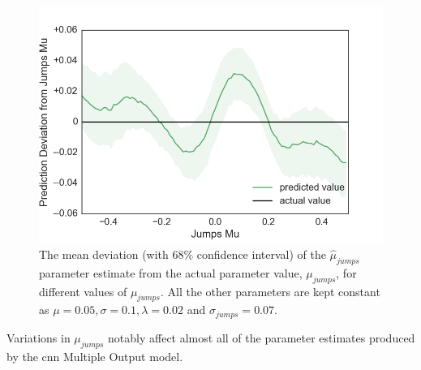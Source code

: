 \documentclass[11pt,oneside,openany,a4paper,english, report, goldenblock
]{usthesis}
\begin{document}
\begin{figure}[h]
	\centering
	\includegraphics[width=0.5\linewidth]{Images/Output-Sensitivity-Results/ConvolutionalNN-MultipleOutput-ELU/Varying-Jumps_mu/Jumps_Mu}
	\caption{The mean deviation (with $68\%$ confidence interval) of the $\hat{\mu}_{jumps}$ parameter estimate from the actual parameter value, $\mu_{jumps}$, for different values of $\mu_{jumps}$. All the other parameters are kept constant as $\mu = 0.05, \sigma = 0.1, \lambda = 0.02$ and $\sigma_{jumps} = 0.07$.}
	\label{fig:sensitivity_test:multiple_output:varying_jumps_mu:jumps_mu}
\end{figure}

Variations in $\mu_{jumps}$ notably affect almost all of the parameter estimates produced by the \acrshort{cnn} Multiple Output model.
\end{document}
